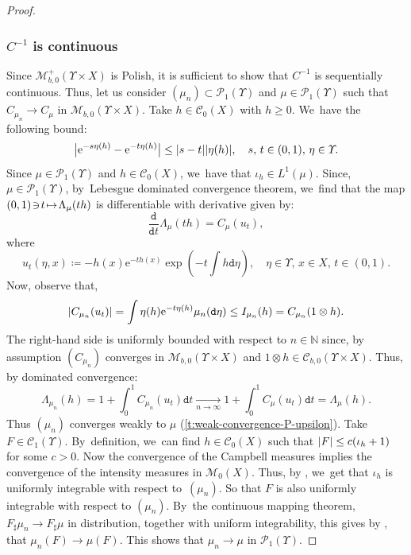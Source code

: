 \documentclass[JEP,XML,SOM,Unicode,published]{cedram}
\newcommand\mto{\mathchoice{\longmapsto}{\mapsto}{\mapsto}{\mapsto}}
\theoremstyle{definition}
\theoremstyle{remark}
\DeclarePairedDelimiter{\abs}{\lvert}{\rvert}
\begin{document}
\begin{proof}
\subsubsection*{$C^{-1}$ is continuous}
Since $\mathscr{M}^{+}_{b,0}(\varUpsilon \times X)$ is Polish, it is sufficient to show that $C^{-1}$ is sequentially continuous.
Thus, let us consider $(\mu_{n}) \subset \mathscr{P}_{1}(\varUpsilon)$ and $\mu \in \mathscr{P}_{1}(\varUpsilon)$ such that $C_{\mu_{n}} \to C_{\mu}$ in $\mathscr{M}_{b,0}(\varUpsilon \times X)$.
Take $h \in \mathscr{C}_{0}(X)$ with $h \geq 0$. We~have the following bound:
\begin{equation*}
\abs[\big]{\mathrm{e}^{-s\eta(h)} - \mathrm{e}^{-t\eta(h)} } \leq \abs{s-t} \abs{\eta(h)}, \quad s,\,t \in (0,1),\, \eta \in \varUpsilon.
\end{equation*}
Since $\mu \!\in\! \mathscr{P}_{1}(\varUpsilon)$ and $h \!\in\! \mathscr{C}_{0}(X)$, we~have that $\iota_{h} \!\in\! L^{1}(\mu)$.
Since, $\mu \!\in\! \mathscr{P}_{1}(\varUpsilon)$, by~Lebesgue dominated convergence theorem, we~find that the map $(0,1) \!\ni\! t \!\mto\! \Lambda_{\mu}(th)$ is differentiable with derivative given by:
\begin{equation*}
\frac{\mathtt{d}}{\mathtt{d} t} \Lambda_{\mu}(th) = C_{\mu}(u_{t}),
\end{equation*}
where
\begin{equation*}
u_{t}(\eta, x) \coloneq - h(x) \mathrm{e}^{-th(x)} \exp\left(-t \int h \mathtt{d} \eta\right), \quad \eta \in \varUpsilon,\, x \in X,\, t \in (0,1).
\end{equation*}
Now, observe that,
\begin{equation*}
\abs{ C_{\mu_{n}}(u_{t}) } = \int \eta(h) \mathrm{e}^{-t\eta(h)} \mu_{n}(\mathtt{d} \eta) \leq I_{\mu_{n}}(h) = C_{\mu_{n}}(1 \otimes h).
\end{equation*}
The right-hand side is uniformly bounded with respect to $n \in \mathbb{N}$ since, by assumption $(C_{\mu_{n}})$ converges in $\mathscr{M}_{b,0}(\varUpsilon \times X)$ and $1 \otimes h \in \mathscr{C}_{b,0}(\varUpsilon \times X)$.
Thus, by dominated convergence:
\begin{equation*}
\Lambda_{\mu_{n}}(h) = 1 + \int_{0}^{1} C_{\mu_{n}}(u_{t}) \mathtt{d} t \xrightarrow[n \to \infty]{} 1 + \int_{0}^{1} C_{\mu}(u_{t}) \mathtt{d} t = \Lambda_{\mu}(h).
\end{equation*}
Thus $(\mu_{n})$ converges weakly to $\mu$ (\cref{t:weak-convergence-P-upsilon}).
Take $F \in \mathscr{C}_{1}(\varUpsilon)$.
By~definition, we~can find $h \in \mathscr{C}_{0}(X)$ such that $\abs{F} \leq c (\iota_{h} + 1)$ for some $c > 0$.
Now the convergence of the Campbell measures implies the convergence of the intensity measures in $\mathscr{M}_{0}(X)$.
Thus, by \cite[Lem.\,5.11]{KallenbergFMP}, we~get that $\iota_{h}$ is uniformly integrable with respect to~$(\mu_{n})$.
So that $F$ is also uniformly integrable with respect to $(\mu_{n})$.
By~the continuous mapping theorem, $F_{\sharp} \mu_{n} \to F_{\sharp} \mu$ in distribution, together with uniform integrability, this gives by \cite[Lem.\,5.11]{KallenbergFMP}, that $\mu_{n}(F) \to \mu(F)$.
This shows that $\mu_{n} \to \mu$ in $\mathscr{P}_{1}(\varUpsilon)$.
\end{proof}
\end{document}
